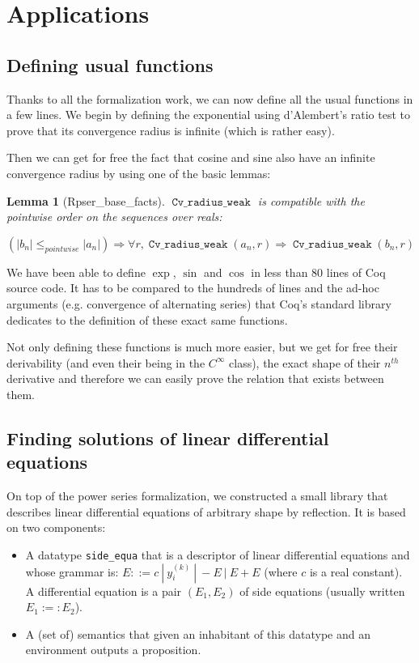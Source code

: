 \documentclass[submission,copyright]{eptcs}
\DeclareMathOperator{\cvrw}{\mathtt{Cv\_radius\_weak}}
\newtheorem{lemma}{Lemma}
\begin{document}
\section{Applications}

\subsection{Defining usual functions}

Thanks to all the formalization work, we can now define all the usual
functions in a few lines. We begin by defining the exponential using
d'Alembert's ratio test to prove that its convergence radius is infinite
(which is rather easy).

Then we can get for free the fact that cosine and sine also have an
infinite convergence radius by using one of the basic lemmas:

\begin{lemma}[Rpser\_base\_facts] $\cvrw{}$ is compatible with the
pointwise order on the sequences over reals:

$$\left(\left|b_n\right| \le_{pointwise} \left|a_n\right|\right)
  \Rightarrow \forall r, \cvrw{}(a_n,r) \Rightarrow \cvrw{}(b_n,r)$$
\end{lemma}

We have been able to define $\exp$, $\sin$ and $\cos$ in less than 80
lines of Coq source code. It has to be compared to the hundreds
of lines and the ad-hoc arguments (e.g. convergence of alternating series)
that Coq's standard library dedicates to the definition of these exact
same functions.

Not only defining these functions is much more easier, but we get for
free their derivability (and even their being in the $C^{\infty}$ class),
the exact shape of their $n^{th}$ derivative and therefore we can easily
prove the relation that exists between them.

\subsection{Finding solutions of linear differential equations}

On top of the power series formalization, we constructed a small library
that describes linear differential equations of arbitrary shape by
reflection. It is based on two components:

\begin{itemize}
 \item A datatype \texttt{side\_equa} that is a descriptor of linear 
   differential equations and whose grammar is:
   $E ::= c ~|~ y_i^{(k)} ~|~ - E ~|~ E + E$  (where $c$ is a real constant).
   A differential equation is a pair $(E_1,E_2)$ of side equations
   (usually written $E_1 :=: E_2$).
 
 \item A (set of) semantics that given an inhabitant of this datatype
	and an environment outputs a proposition.
\end{itemize}
\end{document}
